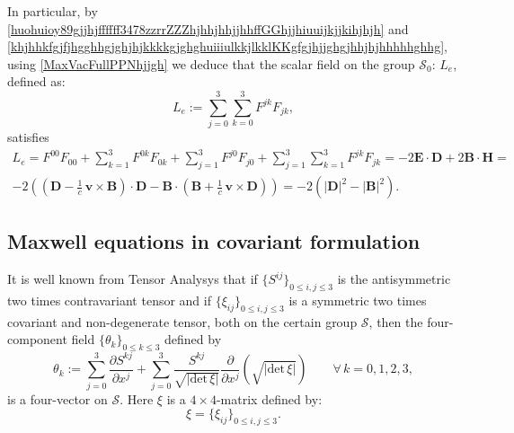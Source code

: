 \documentclass{article}
\theoremstyle{definition}
\theoremstyle{remark}
\renewcommand{\vec}[1]{\mathbf{#1}}
\newcommand{\er}{\eqref}
\newcommand{\er}{\eqref}
\begin{document}
In particular, by
\er{huohuioy89gjjhjffffff3478zzrrZZZhjhhjhhjjhhffGGhjjhiuuijkjjkihjhjh}
and
\er{khjhhkfgjfjhgghhgjghjhjkkkkgjghghuiiiulkkjlkklKKgfgjhjjghgjhhjhjhhhhhghhg},
using \er{MaxVacFullPPNhjjgh} we deduce that the scalar field on the
group $\mathcal{S}_0$: $L_e$, defined as:
\begin{equation}\label{MaxVacFullPPNhjjghjjkjhh}
L_e:=\sum_{j=0}^{3}\sum_{k=0}^{3}F^{jk}F_{jk},
\end{equation}
satisfies
\begin{multline}\label{MaxVacFullPPNhjjghjjkjhh1}
L_e=F^{00}F_{00}+\sum_{k=1}^{3}F^{0k}F_{0k}+\sum_{j=1}^{3}F^{j0}F_{j0}+\sum_{j=1}^{3}\sum_{k=1}^{3}F^{jk}F_{jk}=-2\vec
E\cdot\vec D+2\vec B\cdot\vec H=\\-2\left(\left(\vec
D-\frac{1}{c}\,\vec v\times \vec B\right)\cdot\vec D-\vec
B\cdot\left(\vec B+\frac{1}{c}\,\vec v\times \vec
D\right)\right)=-2\left(|\vec D|^2-|\vec B|^2\right).
\end{multline}
\subsection{Maxwell equations in covariant formulation}
It is well known from Tensor Analysys that if $\{S^{ij}\}_{0\leq
i,j\leq 3}$ is the antisymmetric two times contravariant tensor and
if $\{\xi_{ij}\}_{0\leq i,j\leq 3}$ is a symmetric two times
covariant and non-degenerate tensor, both on the certain group
$\mathcal{S}$, then the four-component field $\{\theta_{k}\}_{0\leq
k\leq 3}$ defined by
\begin{equation}\label{MaxVacFullPPNhjjghjjkjhhoujii}
\theta_k:=\sum_{j=0}^{3}\frac{\partial S^{kj}}{\partial
x^j}+\sum_{j=0}^{3}\frac{S^{kj}}{\sqrt{|\text{det}\,\xi|}}\frac{\partial}{\partial
x^j}\left(\sqrt{|\text{det}\,\xi|}\right)\quad\quad\forall\,
k=0,1,2,3,
\end{equation}
is a four-vector on $\mathcal{S}$. Here $\xi$ is a $4\times
4$-matrix defined by:
\begin{equation}\label{fgjfjhgghhgjghjhjkkkkgjghghuiiiuujhjhjkljjhjhjji}
\xi=\{\xi_{ij}\}_{0\leq i,j\leq 3}.
\end{equation}
\end{document}
